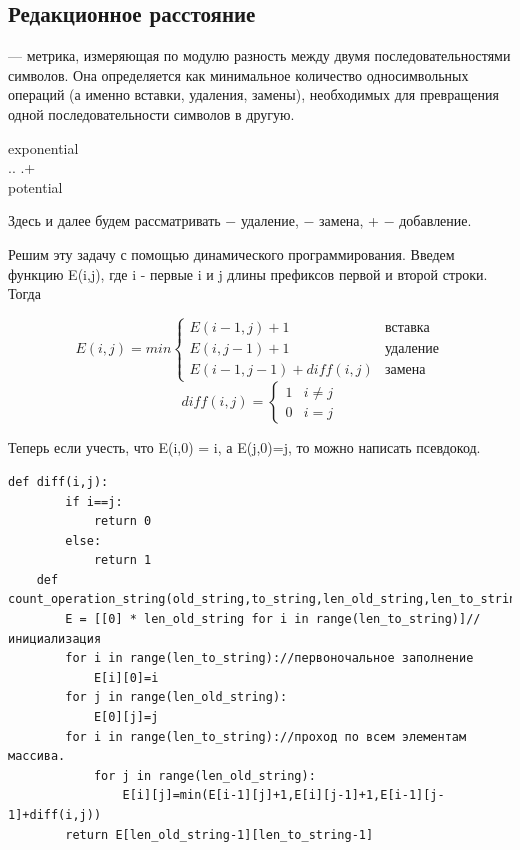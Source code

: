     \subsection{Редакционное расстояние}
    \begin{definition}
         $—$ метрика, измеряющая по модулю разность между двумя последовательностями символов. Она определяется как минимальное количество односимвольных операций (а именно вставки, удаления, замены), необходимых для превращения одной последовательности символов в другую.
        \begin{center}
            exponential  \\
            \times \times .. \updownarrow \updownarrow .+ \updownarrow \\
            potential 
        \end{center}
    \end{definition} 
    Здесь и далее будем рассматривать \times $-$ удаление, \updownarrow $-$ замена, + $-$ добавление.

    Решим эту задачу с помощью динамического программирования. 
    Введем функцию E(i,j), где i - первые i и j длины префиксов первой и второй строки.
    Тогда
    \begin{center}
        \begin{equation*}
        E(i,j) =min 
        \begin{cases}
         E(i-1,j)+1 &\text{вставка}\\
         E(i,j-1)+1 &\text{удаление}\\
         E(i-1,j-1)+diff(i,j) &\text{замена}
    \end{cases}
    \end{equation*}
    \begin{equation*}
    diff(i,j) = 
 \begin{cases}
   1 & i \neq j\\
   0 & i=j
 \end{cases}
\end{equation*}
    \end{center}
    Теперь если учесть, что  E(i,0) = i, а E(j,0)=j, то можно написать псевдокод.
    \begin{lstlisting}[label=def-reductio,caption=Пример  нахождения минимального количества операций преобразования одной строки в другую]
    def diff(i,j):
        if i==j:
            return 0
        else:
            return 1
    def count_operation_string(old_string,to_string,len_old_string,len_to_string):
        E = [[0] * len_old_string for i in range(len_to_string)]//инициализация
        for i in range(len_to_string)://первоночальное заполнение
            E[i][0]=i
        for j in range(len_old_string):
            E[0][j]=j
        for i in range(len_to_string)://проход по всем элементам массива.
            for j in range(len_old_string):
                E[i][j]=min(E[i-1][j]+1,E[i][j-1]+1,E[i-1][j-1]+diff(i,j))
        return E[len_old_string-1][len_to_string-1]
        \end{lstlisting}
